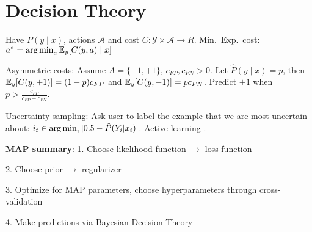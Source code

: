 \section{Decision Theory}

Have $P(y\mid x)$, actions $\mathcal{A}$ and cost $C : \mathcal{Y} \times
\mathcal{A} \rightarrow R$. Min.\ Exp.\ cost: $a^* = \operatorname*{arg\,min}_a \mathbb{E}_y[C(y, a)\mid
x]$

Asymmetric costs: Assume $A = \{-1,+1\}$, $c_{FP}, c_{FN} > 0$. Let $\hat{P}(y
\mid x) = p$, then $\mathbb{E}_y[C(y, +1)] = (1-p) c_{FP}$ and $\mathbb{E}_y[C(y,-1)] = p
c_{FN}$. Predict $+1$ when $p > \frac{c_{FP}}{c_{FP}+c_{FN}}$.

Uncertainty sampling: Ask user to label the example that we are most uncertain about: $i_t \in \operatorname*{arg\,min}_i | 0.5 - \hat{P} (Y_i|x_i)|$. Active learning .


\textbf{MAP summary}:  1. Choose likelihood function $\rightarrow$ loss function

2. Choose prior $\rightarrow$ regularizer

3. Optimize for MAP parameters, choose hyperparameters through cross-validation

4. Make predictions via Bayesian Decision Theory